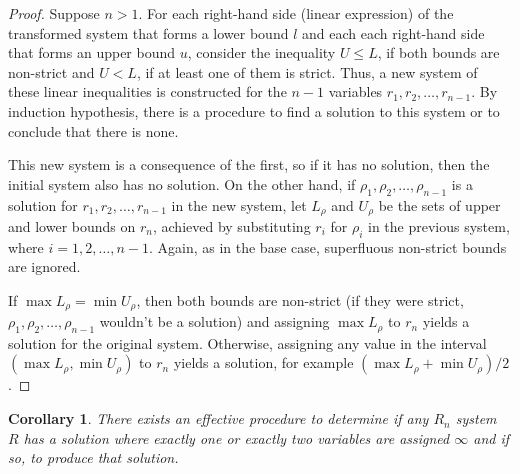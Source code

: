 \documentclass{article}
\newtheorem*{corollary}{Corollary}
\begin{document}
\begin{proof}
  Suppose $n > 1$. For each right-hand side (linear expression) of the transformed system that forms a lower bound $l$ and each each right-hand side that forms an upper bound $u$, consider the inequality $U \leq L$, if both bounds are non-strict and $U < L$, if at least one of them is strict. Thus, a new system of these linear inequalities is constructed for the $n-1$ variables $r_1, r_2, \dots, r_{n-1}$. By induction hypothesis, there is a procedure to find a solution to this system or to conclude that there is none.

  This new system is a consequence of the first, so if it has no solution, then the initial system also has no solution. On the other hand, if $\rho_1, \rho_2, \dots, \rho_{n-1}$ is a solution for $r_1, r_2, \dots, r_{n-1}$ in the new system, let $L_\rho$ and $U_\rho$ be the sets of upper and lower bounds on $r_n$, achieved by substituting $r_i$ for $\rho_i$ in the previous system, where $i = 1, 2, \dots, n-1$. Again, as in the base case, superfluous non-strict bounds are ignored.

  If $\max L_\rho = \min U_\rho$, then both bounds are non-strict (if they were strict, $\rho_1, \rho_2, \dots, \rho_{n-1}$ wouldn't be a solution) and assigning $\max L_\rho$ to $r_n$ yields a solution for the original system. Otherwise, assigning any value in the interval $(\max L_\rho, \min U_\rho)$ to $r_n$ yields a solution, for example $(\max L_\rho + \min U_\rho)/2$.
\end{proof}
\begin{corollary}
  There exists an effective procedure to determine if any $R_n$ system $R$ has a solution where exactly one or exactly two variables are assigned $\infty$ and if so, to produce that solution.
\end{corollary}
\end{document}
